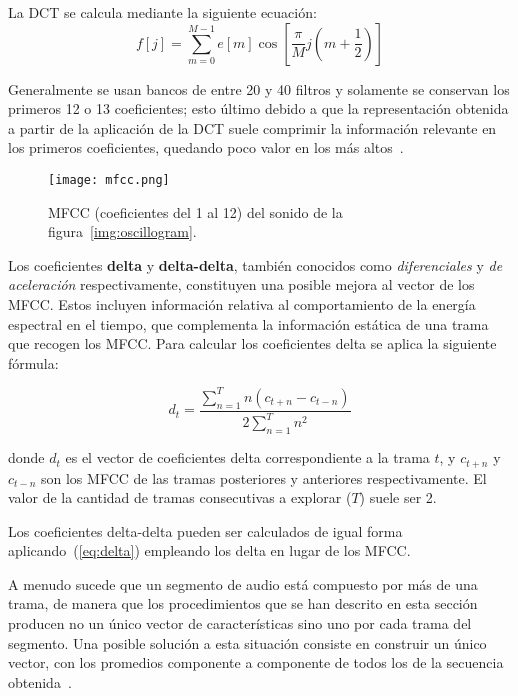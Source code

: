 La DCT se calcula mediante la siguiente ecuación:
\begin{equation}
    \label{eq:DCT}
    f[j] = \sum_{m=0}^{M-1}{e[m]\cos{\left[ \frac{\pi}{M}j\left( m + \frac{1}{2} \right) \right]}}
\end{equation}

Generalmente se usan bancos de entre 20 y 40 filtros y solamente se conservan los primeros 12 o 13 coeficientes;
esto último debido a que la representación obtenida a partir de la aplicación de la DCT suele comprimir la información relevante en los primeros coeficientes, quedando poco valor en los más altos~\cite{Davis80}.

\begin{figure}[!h]
    \centering
    \texttt{[image: mfcc.png]}
    \caption{MFCC (coeficientes del 1 al 12) del sonido de la figura~\ref{img:oscillogram}.}
    \label{img:mfcc}
\end{figure}

Los coeficientes \textbf{delta} y \textbf{delta-delta}, también conocidos como \textit{diferenciales} y \textit{de aceleración} respectivamente,
constituyen una posible mejora al vector de los MFCC.
Estos incluyen información relativa al comportamiento de la energía espectral en el tiempo, que complementa la información estática de una trama que recogen los MFCC.
Para calcular los coeficientes delta se aplica la siguiente fórmula:

\begin{equation}
    \label{eq:delta}
    d_t = \frac{\sum_{n=1}^{T}{n(c_{t+n} - c_{t-n})}}{2\sum_{n=1}^{T}{n^2}}
\end{equation}

\noindent
donde $d_t$ es el vector de coeficientes delta correspondiente a la trama $t$, y $c_{t+n}$ y $c_{t-n}$ son los MFCC de las tramas posteriores y anteriores respectivamente.
El valor de la cantidad de tramas consecutivas a explorar ($T$) suele ser 2.

Los coeficientes delta-delta pueden ser calculados de igual forma aplicando~(\ref{eq:delta}) empleando los delta en lugar de los MFCC.

A menudo sucede que un segmento de audio está compuesto por más de una trama, de manera que los procedimientos que se han descrito en esta sección producen no un único vector de características sino uno por cada trama del segmento.
Una posible solución a esta situación consiste en construir un único vector, con los promedios componente a componente de todos los de la secuencia obtenida~\cite{Lee06,Fagerlund07}.